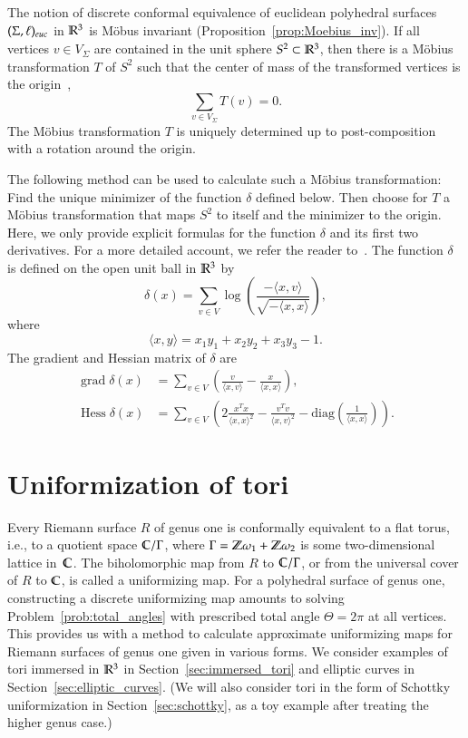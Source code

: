 \documentclass[Thesis]{subfiles}
\begin{document}
The notion of discrete conformal equivalence of euclidean polyhedral
surfaces $(\Sigma,\ell)_{\euc}$ in $\mathbb R^{3}$ is M{\"o}bus invariant
(Proposition~\ref{prop:Moebius_inv}). If all vertices $v\in
V_{\Sigma}$ are contained in the unit sphere $S^{2}\subset\mathbb R^{3}$,
then there is a M{\"o}bius transformation $T$ of $S^{2}$ such that the
center of mass of the transformed vertices is the
origin~\cite{Springborn05},
\begin{equation*}
\sum_{v\in V_{\Sigma}}T(v) = 0.
\end{equation*}
The M{\"o}bius transformation $T$ is uniquely determined up to
post-composition with a rotation around the origin.

The following method can be used to calculate such a M{\"o}bius
transformation: Find the unique minimizer of the function $\delta$
defined below. Then choose for $T$ a M{\"o}bius transformation that
maps $S^{2}$ to itself and the minimizer to the origin. Here, we only
provide explicit formulas for the function $\delta$ and its first two
derivatives. For a more detailed account, we refer the reader
to~\cite{Springborn05}. The function $\delta$ is defined on the open
unit ball in $\mathbb R^{3}$ by
\begin{equation}
  \delta(x) = \sum_{v\in V}
  \log\left(\frac{-\langle x,v\rangle}{\sqrt{-\langle x,x\rangle}}\right),
\end{equation}
where 
\begin{equation}
  \langle x,y\rangle=x_1y_1+x_2y_2+x_3y_3-1. 
\end{equation}
The gradient and Hessian matrix of $\delta$ are
\begin{align} 
	\operatorname{grad}\delta(x)
        &= \sum_{v\in V}\left(\frac{v}{\langle x,v\rangle} -
          \frac{x}{\langle x,x\rangle}\right),\\
	 \operatorname{Hess}\delta(x)
        &= \sum_{v\in V}\left(2\frac{x^Tx}{\langle x,x\rangle^2}-\frac{v^Tv}{\langle x,v\rangle^2} - \mathrm{diag}\left(\frac{1}{\langle x,x\rangle}\right)\right).
\end{align}

\section{Uniformization of tori}
\label{sec:tori}

Every Riemann surface $R$ of genus one is conformally equivalent to a
flat torus, i.e., to a quotient space $\mathbb C/\Gamma$, where
$\Gamma=\mathbb Z\omega_{1}+\mathbb Z\omega_{2}$ is some two-dimensional lattice
in~$\mathbb C$. The biholomorphic map from $R$ to $\mathbb C/\Gamma$, or from the
universal cover of $R$ to $\mathbb C$, is called a uniformizing map. For a
polyhedral surface of genus one, constructing a discrete uniformizing
map amounts to solving Problem~\ref{prob:total_angles} with prescribed
total angle $\Theta=2\pi$ at all vertices. This provides us with a
method to calculate approximate uniformizing maps for Riemann surfaces
of genus one given in various forms. We consider examples of tori
immersed in $\mathbb R^{3}$ in Section~\ref{sec:immersed_tori} and elliptic
curves in Section~\ref{sec:elliptic_curves}. (We will also consider
tori in the form of Schottky uniformization in
Section~\ref{sec:schottky}, as a toy example after treating the higher
genus case.)
\end{document}
